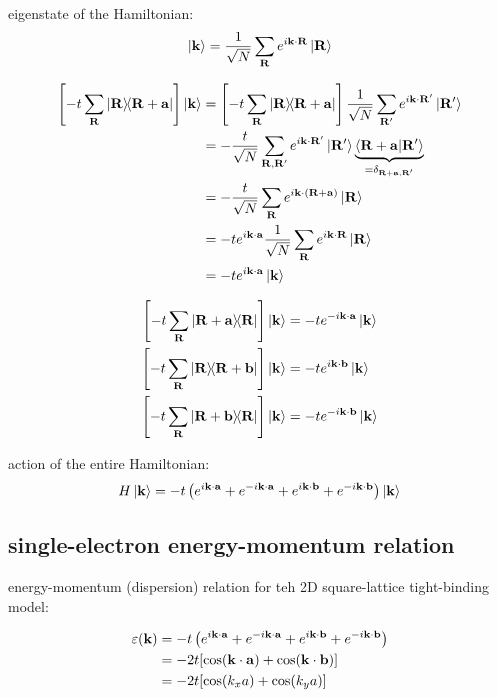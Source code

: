 \documentclass[10pt, a4paper, twocolumn]{article}
\begin{document}
eigenstate of the Hamiltonian:
\[\ket{\vb k} = \frac{1}{\sqrt N}
\sum _{\vb R} e^{i\vb k\cdot \vb R}\ket{\vb R}\]

\begin{equation*}
\begin{aligned}
\left[ -t\sum _{\vb R}
\dyad{\vb R}{\vb R+\vb a}\right]\ket{\vb k}
&=\left[ -t\sum _{\vb R}
\dyad{\vb R}{\vb R+\vb a}\right]
\frac{1}{\sqrt N}\sum _{\vb R'}
e^{i\vb k\cdot \vb R'}\ket{\vb R'}
\\&=-\frac{t}{\sqrt N}
\sum _{\vb R,\vb R'}
e^{i\vb k\cdot \vb R'}\ket{\vb R'}
\underbrace{\ip{\vb R+\vb a}{\vb R'}}
_{=\delta _{\vb R+\vb a, \vb R'}}
\\&=-\frac{t}{\sqrt N}\sum_{\vb R}
e^{i\vb k\cdot (\vb R+\vb a)} \ket{\vb R}
\\&=-te^{i\vb k \cdot \vb a}\frac{1}{\sqrt N}
\sum _{\vb R}e^{i\vb k\cdot \vb R}\ket{\vb R}
\\&=-te^{i\vb k \cdot \vb a} \ket{\vb k}
\end{aligned}
\end{equation*}

\begin{equation*}
\begin{aligned}
\left[ -t\sum _{\vb R}
\dyad{\vb R+\vb a}{\vb R}\right]\ket{\vb k}
&= -te^{-i\vb k\cdot \vb a}\ket{\vb k}
\\ \left[ -t\sum _{\vb R}
\dyad{\vb R}{\vb R+\vb b}\right]\ket{\vb k}
&= -te^{i\vb k\cdot \vb b}\ket{\vb k}
\\ \left[ -t\sum _{\vb R}
\dyad{\vb R+\vb b}{\vb R}\right]\ket{\vb k}
&= -te^{-i\vb k\cdot \vb b}\ket{\vb k}
\end{aligned}
\end{equation*}

action of the entire Hamiltonian:
\[H\ket{\vb k} = -t\left( e^{i\vb k \cdot \vb a}
+e^{-i\vb k\cdot \vb a} +e^{i\vb k\cdot \vb b}
+e^{-i\vb k\cdot \vb b} \right) \ket{\vb k} \]

\subsection{single-electron energy-momentum relation}

energy-momentum (dispersion) relation for teh 2D square-lattice tight-binding model:

\begin{equation*}
\begin{aligned}
\varepsilon (\vb k) &=
 -t\left( e^{i\vb k \cdot \vb a}
+e^{-i\vb k\cdot \vb a} +e^{i\vb k\cdot \vb b}
+e^{-i\vb k\cdot \vb b} \right)
\\&=-2t[\cos(\vb k\cdot \vb a) + \cos(\vb k\cdot \vb b)]
\\&=-2t[\cos(k_xa) + \cos(k_ya)]
\end{aligned}
\end{equation*}
\end{document}
